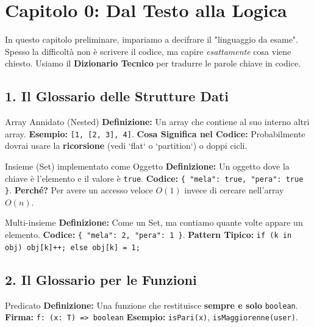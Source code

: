 \section{Capitolo 0: Dal Testo alla Logica}

In questo capitolo preliminare, impariamo a decifrare il "linguaggio da esame". Spesso la difficoltà non è scrivere il codice, ma capire \textit{esattamente} cosa viene chiesto.
Usiamo il \textbf{Dizionario Tecnico} per tradurre le parole chiave in codice.

\subsection{1. Il Glossario delle Strutture Dati}

\begin{dizionario}{Array Annidato (Nested)}
\textbf{Definizione:} Un array che contiene al suo interno altri array.
\textbf{Esempio:} \texttt{[1, [2, 3], 4]}.
\textbf{Cosa Significa nel Codice:} Probabilmente dovrai usare la \textbf{ricorsione} (vedi `flat` o `partition`) o doppi cicli.
\end{dizionario}

\begin{dizionario}{Insieme (Set) implementato come Oggetto}
\textbf{Definizione:} Un oggetto dove la chiave è l'elemento e il valore è \texttt{true}.
\textbf{Codice:} \texttt{\{ "mela": true, "pera": true \}}.
\textbf{Perché?} Per avere un accesso veloce $O(1)$ invece di cercare nell'array $O(n)$.
\end{dizionario}

\begin{dizionario}{Multi-insieme}
\textbf{Definizione:} Come un Set, ma contiamo quante volte appare un elemento.
\textbf{Codice:} \texttt{\{ "mela": 2, "pera": 1 \}}.
\textbf{Pattern Tipico:} \texttt{if (k in obj) obj[k]++; else obj[k] = 1;}
\end{dizionario}

\subsection{2. Il Glossario per le Funzioni}

\begin{dizionario}{Predicato}
\textbf{Definizione:} Una funzione che restituisce \textbf{sempre e solo} \texttt{boolean}.
\textbf{Firma:} \texttt{f: (x: T) => boolean}
\textbf{Esempio:} \texttt{isPari(x)}, \texttt{isMaggiorenne(user)}.
\end{dizionario}

